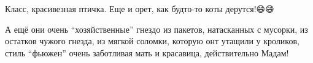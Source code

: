  
 
 
 
 

\qqSecCmt


Класс, красивезная птичка. Еще и орет, как будто-то коты дерутся!😄😄


А ещё они очень \enquote{хозяйственные} гнездо из пакетов, натасканных с мусорки, из
остатков чужого гнезда, из мягкой соломки, которую онт утащили у кроликов,
стиль \enquote{фьюжен} очень заботливая мать и красавица, действительно Мадам!
